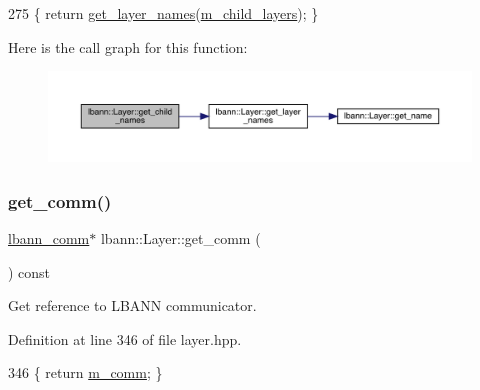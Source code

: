 \begin{DoxyCode}
275 \{ \textcolor{keywordflow}{return} \hyperlink{classlbann_1_1Layer_af4a093d91552cf079217eb346bbb847f}{get\_layer\_names}(\hyperlink{classlbann_1_1Layer_ae348c0d2b4d05f74d809d09debb633c0}{m\_child\_layers}); \}
\end{DoxyCode}
Here is the call graph for this function\+:\nopagebreak
\begin{figure}[H]
\begin{center}
\leavevmode
\includegraphics[width=350pt]{classlbann_1_1Layer_afc7bf4e2a61a6f47f9e1f185bf92439a_cgraph}
\end{center}
\end{figure}
\mbox{\label{classlbann_1_1Layer_a1b528e5872357a82176ee487596b363c}} 
\subsubsection{\texorpdfstring{get\+\_\+comm()}{get\_comm()}}
{\footnotesize\ttfamily \hyperlink{classlbann_1_1lbann__comm}{lbann\+\_\+comm}$\ast$ lbann\+::\+Layer\+::get\+\_\+comm (\begin{DoxyParamCaption}{ }\end{DoxyParamCaption}) const\hspace{0.3cm}{\ttfamily [inline]}}

Get reference to L\+B\+A\+NN communicator. 

Definition at line 346 of file layer.\+hpp.


\begin{DoxyCode}
346 \{ \textcolor{keywordflow}{return} \hyperlink{classlbann_1_1Layer_a5de05c52f22e0bbd7c703bec3ad4dbf2}{m\_comm}; \}
\end{DoxyCode}
\mbox{\label{classlbann_1_1Layer_a63c694744d9360208642a35412a4e8ee}} 
